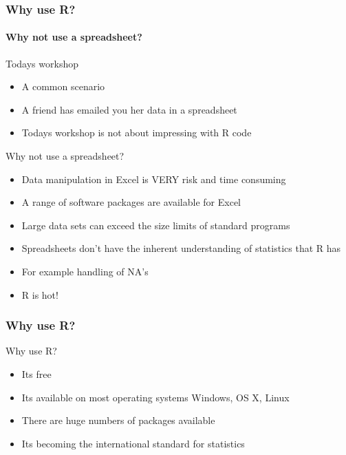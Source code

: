 \documentclass[10pt,handout,english]{beamer}\usepackage[]{graphicx}\usepackage[]{color}
\begin{document}
\begin{frame}
  \frametitle{Why use R?}
  \framesubtitle{Why not use a spreadsheet?}

\begin{block}{Todays workshop}
\begin{itemize}
\item A common scenario
\item A friend has emailed you her data in a spreadsheet
\item Todays workshop is not about impressing with R code
\end{itemize}

\end{block}
  \begin{block}{Why not use a spreadsheet?}
  \begin{itemize}
    \item Data manipulation in Excel is VERY risk and time consuming
    \item A range of software packages are available for Excel
    \item Large data sets can exceed the size limits of standard programs
    \item Spreadsheets don't have the inherent understanding of statistics that R has
    \item For example handling of N\/A's
    \item R is hot!
  \end{itemize}
  \end{block}
\end{frame}

\begin{frame}
  \frametitle{Why use R?}
  \begin{block}{Why use R?}
  \begin{itemize}
    \item Its free
    \item Its available on most operating systems Windows, OS X, Linux
    \item There are huge numbers of packages available
    \item Its becoming the international standard for statistics
  \end{itemize}
  \end{block}
\end{frame}

\end{document}
